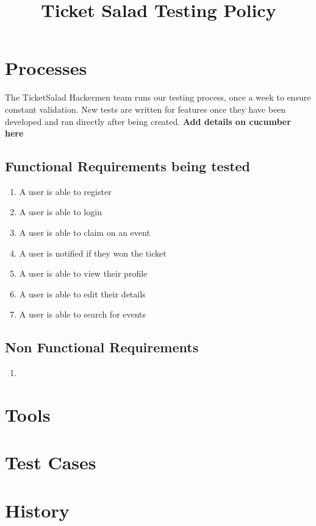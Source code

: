 \documentclass[11pt]{article}
\begin{document}
	\title{Ticket Salad Testing Policy}
	\date{}
	\maketitle
	\newpage
	\tableofcontents
	\newpage
	\section{Processes}
	The TicketSalad Hackermen team runs our testing process, once a week to ensure constant validation. New tests are written for features once they have been developed and ran directly after being created. 
	\newline \textbf{Add details on cucumber here}
	\subsection{Functional Requirements being tested}
	\begin{enumerate}
		\item A user is able to register
		\item A user is able to login
		\item A user is able to claim on an event
		\item A user is notified if they won the ticket
		\item A user is able to view their profile
		\item A user is able to edit their details
		\item A user is able to search for events
	\end{enumerate}
	\subsection{Non Functional Requirements}
	\begin{enumerate}
		\item 
	\end{enumerate}
	\section{Tools}
	\section{Test Cases}
	\section{History}
\end{document}
